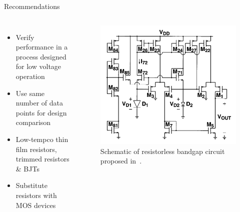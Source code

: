 \documentclass[aspectratio=1610]{beamer} %
\begin{document}
\begin{frame}{Recommendations}{}

    \begin{columns}[c]
        \begin{itemize}
            \item Verify performance in a process designed for low voltage operation
            \item Use same number of data points for design comparison
            \item Low-tempco thin film resistors, trimmed resistors \& BJTs~\cite{Brokaw1974,Malcovati2001,Mok2004}
            \item Substitute resistors with MOS devices~\cite{Buck2002}
        \end{itemize}
    
        \begin{figure}
            \includegraphics[width=0.8\columnwidth]{no_resistors.png}
            \caption{Schematic of resistorless bandgap circuit proposed in~\cite{Buck2002}.}
        \end{figure}
    \end{columns}
\end{frame}
\end{document}
